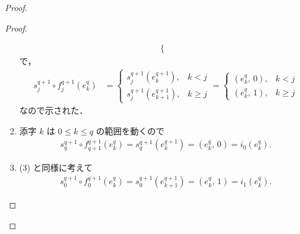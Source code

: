 \documentclass[algtopo_main]{subfiles}
\begin{document}
\begin{proof}
\begin{proof}
\begin{enumerate}
\begin{align}
\begin{cases}
                \end{cases}
            \end{align}
            で，
            \begin{align}
                s_{j}^{q+1} \circ f_j^{q+1} (e_k^q) &=
                \begin{cases}
                    s_{j}^{q+1}(e_k^{q+1}), &k < j \\
                    s_{j}^{q+1}(e_{k+1}^{q+1}), &k \ge j
                \end{cases}
                =
                \begin{cases}
                    (e_k^{q},\, 0), &k < j \\
                    (e_{k}^{q},\, 1), &k \ge j
                \end{cases}
            \end{align}
            なので示された．
            \item 添字 $k$ は $0 \le k \le q$ の範囲を動くので
            \begin{align}
                s_q^{q+1} \circ f_{q+1}^{q+1} (e_k^q) = s_q^{q+1} (e_k^{q+1}) = (e_k^q,\, 0) = i_0(e_k^q).
            \end{align}
            \item (3) と同様に考えて
            \begin{align}
                s_0^{q+1} \circ f_0^{q+1} (e_k^q) = s_0^{q+1} (e^{q+1}_{k+1}) = (e_k^q,\, 1) = i_1(e_k^q).
            \end{align}
        \end{enumerate}
    \end{proof}
    
    \hrulefill


\end{proof}
\end{document}
